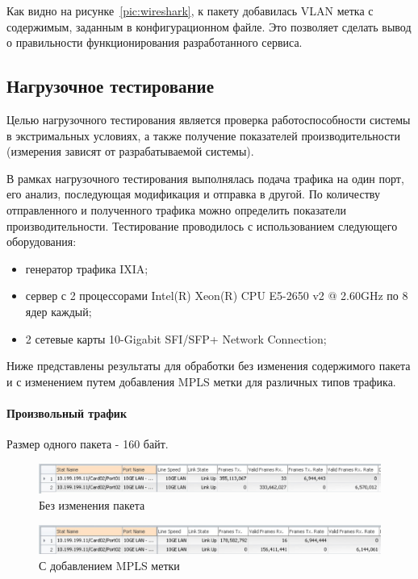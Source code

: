 Как видно на рисунке~\ref{pic:wireshark}, к пакету добавилась VLAN метка с содержимым, заданным в конфигурационном файле. Это позволяет сделать вывод о правильности функционирования разработанного сервиса.

\subsection{Нагрузочное тестирование}
Целью нагрузочного тестирования является проверка работоспособности системы в экстримальных условиях, а также получение показателей производительности (измерения зависят от разрабатываемой системы).

В рамках нагрузочного тестирования выполнялась подача трафика на один порт, его анализ, последующая модификация и отправка в другой. По количеству отправленного и полученного трафика можно определить показатели производительности. Тестирование проводилось с использованием следующего оборудования:
\begin{itemize}
\item генератор трафика IXIA;
\item сервер с 2 процессорами Intel(R) Xeon(R) CPU E5-2650 v2 @ 2.60GHz по 8 ядер каждый;
\item 2 сетевые карты 10-Gigabit SFI/SFP+ Network Connection;
\end{itemize}

Ниже представлены результаты для обработки без изменения содержимого пакета и с изменением путем добавления MPLS метки для различных типов трафика.

\paragraph{Произвольный трафик}

Размер одного пакета - 160 байт. 

\begin{figure}
\centering
\includegraphics[scale=0.6]{pictures/rand_output}
\caption{Без изменения пакета}
\label{pic:rand_output}
\end{figure}

\begin{figure}
\centering
\includegraphics[scale=0.6]{pictures/rand_mpls_output}
\caption{С добавлением MPLS метки}
\label{pic:rand_mpls_output}
\end{figure}

